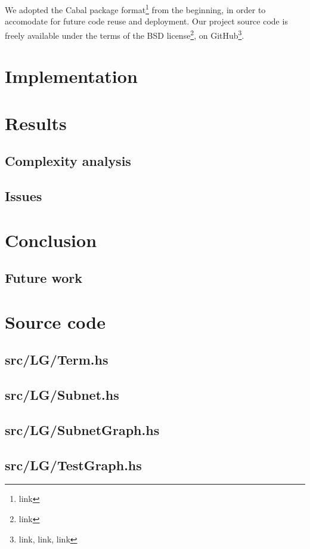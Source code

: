 \documentclass[12pt,a4paper]{article}
\begin{document}
We adopted the Cabal package format\footnote{link} from the beginning, in order to accomodate for future code reuse and deployment. Our project source code is freely available under the terms of the BSD license\footnote{link}, on GitHub\footnote{link, link, link}.


\section{Implementation}

\section{Results}

\subsection{Complexity analysis}

\subsection{Issues}

\section{Conclusion}

\subsection{Future work}


\begin{thebibliography}{9}
\end{thebibliography}


\appendix
\section{Source code}

\subsection{src/LG/Term.hs}

\subsection{src/LG/Subnet.hs}

\subsection{src/LG/SubnetGraph.hs}

\subsection{src/LG/TestGraph.hs}
\end{document}
